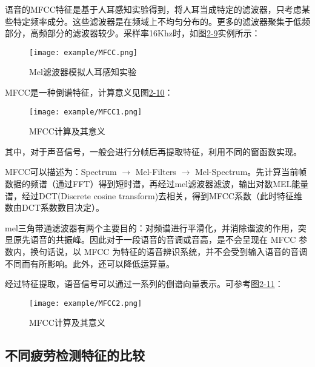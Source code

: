 语音的MFCC特征是基于人耳感知实验得到，将人耳当成特定的滤波器，只考虑某些特定频率成分。这些滤波器是在频域上不均匀分布的。更多的滤波器聚集于低频部分，高频部分的滤波器较少。采样率16Khz时，如图\href{figure:2-9}{2-9}实例所示：

\begin{figure}[!htp]

\centering
\texttt{[image: example/MFCC.png]}
\caption{Mel滤波器模拟人耳感知实验}
\label{table:2-9}

\end{figure}

MFCC是一种倒谱特征，计算意义见图\href{figure:2-10}{2-10}：

\begin{figure}[!htp]

\centering
\texttt{[image: example/MFCC1.png]}
\caption{MFCC计算及其意义}
\label{table:2-10}

\end{figure}

其中，对于声音信号，一般会进行分帧后再提取特征，利用不同的窗函数实现。

MFCC可以描述为：Spectrum $\rightarrow$ Mel-Filters $\rightarrow$ Mel-Spectrum。先计算当前帧数据的频谱（通过FFT）得到短时谱，再经过mel滤波器滤波，输出对数MEL能量谱，经过DCT(Discrete cosine transform)去相关，得到MFCC系数（此时特征维数由DCT系数数目决定）。

mel三角带通滤波器有两个主要目的：对频谱进行平滑化，并消除谐波的作用，突显原先语音的共振峰。因此对于一段语音的音调或音高，是不会呈现在 MFCC 参数内，换句话说，以 MFCC 为特征的语音辨识系统，并不会受到输入语音的音调不同而有所影响。此外，还可以降低运算量。

经过特征提取，语音信号可以通过一系列的倒谱向量表示。可参考图\href{figure:2-11}{2-11}：

\begin{figure}[!htp]

\centering
\texttt{[image: example/MFCC2.png]}
\caption{MFCC计算及其意义}
\label{table:2-11}

\end{figure}

\subsection{不同疲劳检测特征的比较}


